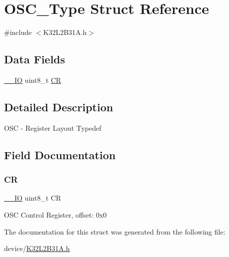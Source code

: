 \hypertarget{struct_o_s_c___type}{}\section{O\+S\+C\+\_\+\+Type Struct Reference}
\label{struct_o_s_c___type}


{\ttfamily \#include $<$K32\+L2\+B31\+A.\+h$>$}

\subsection*{Data Fields}
\begin{DoxyCompactItemize}
\item 
\mbox{\hyperlink{core__cm0plus_8h_aec43007d9998a0a0e01faede4133d6be}{\+\_\+\+\_\+\+IO}} uint8\+\_\+t \mbox{\hyperlink{struct_o_s_c___type_aa8badb87f4f3dc685e151d16014db8f0}{CR}}
\end{DoxyCompactItemize}


\subsection{Detailed Description}
O\+SC -\/ Register Layout Typedef 

\subsection{Field Documentation}
\mbox{\label{struct_o_s_c___type_aa8badb87f4f3dc685e151d16014db8f0}} 
\subsubsection{\texorpdfstring{CR}{CR}}
{\footnotesize\ttfamily \mbox{\hyperlink{core__cm0plus_8h_aec43007d9998a0a0e01faede4133d6be}{\+\_\+\+\_\+\+IO}} uint8\+\_\+t CR}

O\+SC Control Register, offset\+: 0x0 

The documentation for this struct was generated from the following file\+:\begin{DoxyCompactItemize}
\item 
device/\mbox{\hyperlink{_k32_l2_b31_a_8h}{K32\+L2\+B31\+A.\+h}}\end{DoxyCompactItemize}
